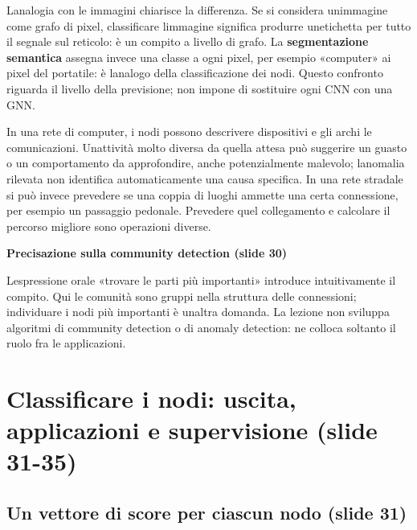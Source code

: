 \documentclass[11pt,a4paper,oneside,openany]{book}
\renewenvironment{quote}{\list{}{\leftmargin=1em\rightmargin=0pt}\item\relax}{\endlist}
\begin{document}
L\textquotesingle analogia con le immagini chiarisce la differenza. Se si considera un\textquotesingle immagine come grafo di pixel, classificare l\textquotesingle immagine significa produrre un\textquotesingle etichetta per tutto il segnale sul reticolo: è un compito a livello di grafo. La \textbf{segmentazione semantica} assegna invece una classe a ogni pixel, per esempio «computer» ai pixel del portatile: è l\textquotesingle analogo della classificazione dei nodi. Questo confronto riguarda il livello della previsione; non impone di sostituire ogni CNN con una GNN.

In una rete di computer, i nodi possono descrivere dispositivi e gli archi le comunicazioni. Un\textquotesingle attività molto diversa da quella attesa può suggerire un guasto o un comportamento da approfondire, anche potenzialmente malevolo; l\textquotesingle anomalia rilevata non identifica automaticamente una causa specifica. In una rete stradale si può invece prevedere se una coppia di luoghi ammette una certa connessione, per esempio un passaggio pedonale. Prevedere quel collegamento e calcolare il percorso migliore sono operazioni diverse.

\begin{quote}
\textbf{Precisazione sulla community detection (slide 30)}
\end{quote}

\begin{quote}
L\textquotesingle espressione orale «trovare le parti più importanti» introduce intuitivamente il compito. Qui le comunità sono gruppi nella struttura delle connessioni; individuare i nodi più importanti è un\textquotesingle altra domanda. La lezione non sviluppa algoritmi di community detection o di anomaly detection: ne colloca soltanto il ruolo fra le applicazioni.
\end{quote}

\section{Classificare i nodi: uscita, applicazioni e supervisione (slide 31-35)}\label{f05-n30-r579}

\subsection{Un vettore di score per ciascun nodo (slide 31)}\label{f05-n30-r581}
\end{document}
